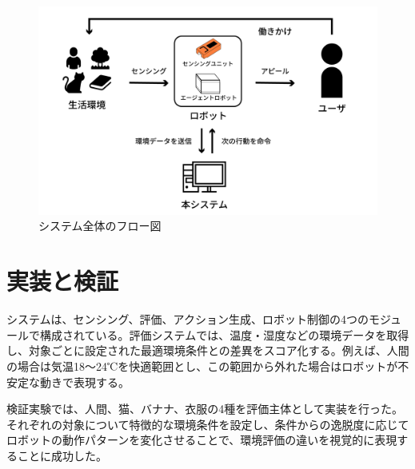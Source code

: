 \documentclass[paper=a4paper,jafontsize=9pt,head_space=15mm,gutter=20mm,twocolumn,number_of_lines=49,
line_length=26zw]{myuarticle}
\begin{document}
\begin{figure}[htb]
  \centering
  \includegraphics[keepaspectratio,width=0.8\columnwidth]{resources/system_flow.png}
  \caption{システム全体のフロー図}
  \label{fig:system-flow}
\end{figure}

\section*{実装と検証}
システムは、センシング、評価、アクション生成、ロボット制御の4つのモジュールで構成されている。評価システムでは、温度・湿度などの環境データを取得し、対象ごとに設定された最適環境条件との差異をスコア化する。例えば、人間の場合は気温18〜24℃を快適範囲とし、この範囲から外れた場合はロボットが不安定な動きで表現する。

検証実験では、人間、猫、バナナ、衣服の4種を評価主体として実装を行った。それぞれの対象について特徴的な環境条件を設定し、条件からの逸脱度に応じてロボットの動作パターンを変化させることで、環境評価の違いを視覚的に表現することに成功した。
\end{document}
